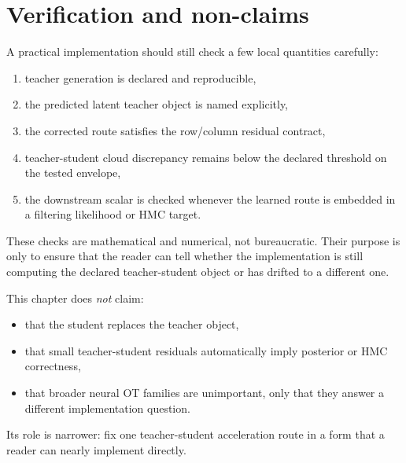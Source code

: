 \section{Verification and non-claims}
\label{sec:bf-learned-ot-verification}
\label{sec:bf-learned-ot-boundary}

A practical implementation should still check a few local quantities carefully:
\begin{enumerate}[label=(\arabic*)]
  \item teacher generation is declared and reproducible,
  \item the predicted latent teacher object is named explicitly,
  \item the corrected route satisfies the row/column residual contract,
  \item teacher-student cloud discrepancy remains below the declared threshold on
  the tested envelope,
  \item the downstream scalar is checked whenever the learned route is embedded
  in a filtering likelihood or HMC target.
\end{enumerate}

These checks are mathematical and numerical, not bureaucratic.  Their purpose is
only to ensure that the reader can tell whether the implementation is still
computing the declared teacher-student object or has drifted to a different one.

This chapter does \emph{not} claim:
\begin{itemize}
  \item that the student replaces the teacher object,
  \item that small teacher-student residuals automatically imply posterior or HMC
  correctness,
  \item that broader neural OT families are unimportant, only that they answer a
  different implementation question.
\end{itemize}
Its role is narrower: fix one teacher-student acceleration route in a form that a
reader can nearly implement directly.

\FloatBarrier
